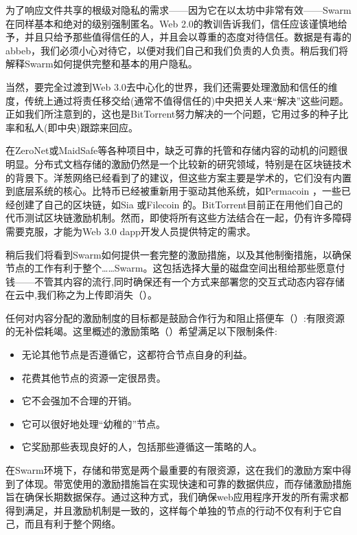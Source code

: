 为了响应文件共享的根级对隐私的需求——因为它在以太坊中非常有效——Swarm在同样基本和绝对的级别强制匿名。Web 2.0的教训告诉我们，信任应该谨慎地给予，并且只给予那些值得信任的人，并且会以尊重的态度对待信任。数据是有毒的abbeb，我们必须小心对待它，以便对我们自己和我们负责的人负责。稍后我们将解释Swarm如何提供完整和基本的用户隐私。

当然，要完全过渡到Web 3.0去中心化的世界，我们还需要处理激励和信任的维度，传统上通过将责任移交给(通常不值得信任的)中央把关人来“解决”这些问题。正如我们所注意到的，这也是BitTorrent努力解决的一个问题，它用过多的种子比率和私人(即中央)跟踪来回应。

在ZeroNet或MaidSafe等各种项目中，缺乏可靠的托管和存储内容的动机的问题很明显。分布式文档存储的激励仍然是一个比较新的研究领域，特别是在区块链技术的背景下。洋葱网络已经看到了\cite{jansen2014onions,ghoshetal2014tor}的建议，但这些方案主要是学术的，它们没有内置到底层系统的核心。比特币已经被重新用于驱动其他系统，如Permacoin \cite{miller2014permacoin}，一些已经创建了自己的区块链，如Sia \cite{vorick2014sia}或Filecoin \cite{filecoin2014}的。BitTorrent目前正在用他们自己的代币\cite{tron2018,bittorrent2019}测试区块链激励机制。然而，即使将所有这些方法结合在一起，仍有许多障碍需要克服，才能为Web 3.0 dapp开发人员提供特定的需求。

稍后我们将看到Swarm如何提供一套完整的激励措施，以及其他制衡措施，以确保节点的工作有利于整个……Swarm。这包括选择大量的磁盘空间出租给那些愿意付钱——不管其内容的流行,同时确保还有一个方式来部署您的交互式动态内容存储在云中,我们称之为上传即消失（）。

任何对内容分配的激励制度的目标都是鼓励合作行为和阻止搭便车（）:有限资源的无补偿耗竭。这里概述的激励策略（）希望满足以下限制条件:

\begin{itemize}
    \item 无论其他节点是否遵循它，这都符合节点自身的利益。
    \item 花费其他节点的资源一定很昂贵。
    \item 它不会强加不合理的开销。
    \item 它可以很好地处理“幼稚的”节点。
    \item 它奖励那些表现良好的人，包括那些遵循这一策略的人。
\end{itemize}

在Swarm环境下，存储和带宽是两个最重要的有限资源，这在我们的激励方案中得到了体现。带宽使用的激励措施旨在实现快速和可靠的数据供应，而存储激励措施旨在确保长期数据保存。通过这种方式，我们确保web应用程序开发的所有需求都得到满足，并且激励机制是一致的，这样每个单独的节点的行动不仅有利于它自己，而且有利于整个网络。 

